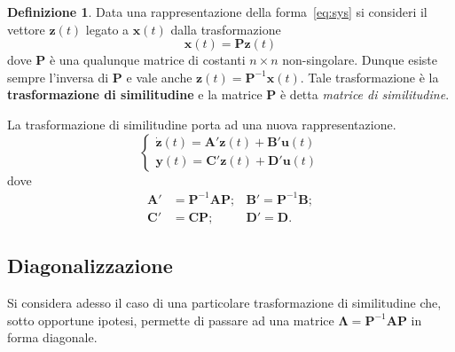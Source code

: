 \documentclass[a4paper]{article}
\renewcommand{\vec}{\bm}
\theoremstyle{definition}
\newtheorem{defn}{Definizione}[subsection]
\begin{document}
			\begin{defn}
				Data una rappresentazione della forma~\eqref{eq:sys} si consideri il vettore $ \vec{z}(t) $ legato a $ \vec{x}(t) $ dalla trasformazione
				\[
					\vec{x}(t) = \vec{P}\vec{z}(t)
				\]
				dove $ \vec{P} $ è una qualunque matrice di costanti $ n\times n $ non-singolare. Dunque esiste sempre l'inversa di $ \vec{P} $ e vale anche $ \vec{z}(t) = \vec{P}^{-1}\vec{x}(t) $. Tale trasformazione è la \textbf{trasformazione di similitudine} e la matrice $ \vec{P} $ è detta \textit{matrice di similitudine}.
			\end{defn}
			La trasformazione di similitudine porta ad una nuova rappresentazione.
			\[
				\begin{cases}
					\vec{\dot{z}}(t) = \vec{A'}\vec{z}(t) + \vec{B'}\vec{u}(t) \\
					\vec{y}(t) = \vec{C'}\vec{z}(t) + \vec{D'}\vec{u}(t)
				\end{cases}
			\]
			dove
			\begin{align*}
				\vec{A'} &= \vec{P}^{-1}\vec{A}\vec{P}; &\vec{B'} = \vec{P}^{-1}\vec{B};\\
				\vec{C'} &= \vec{C}\vec{P}; &\vec{D'} = \vec{D}.
			\end{align*}
			 
		\subsection{Diagonalizzazione}
			Si considera adesso il caso di una particolare trasformazione di similitudine che,
			sotto opportune ipotesi, permette di passare ad una matrice $ \vec{\Lambda} = \vec{P}^{-1}\vec{A}\vec{P} $ in forma diagonale.
			
\end{document}
